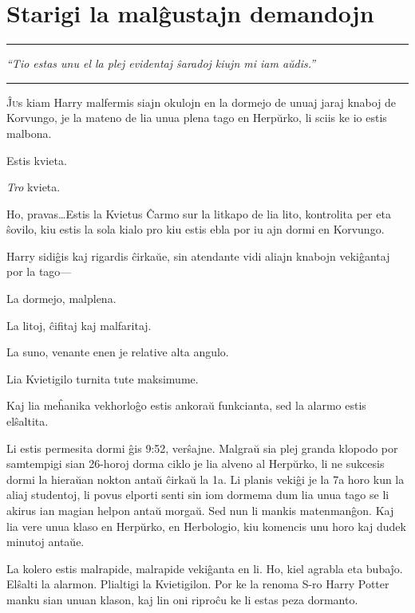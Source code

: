 \chapter{Starigi la malĝustajn demandojn}

\begin{center}\rule{3in}{0.4pt}\end{center}

\emph{``Tio estas unu el la plej evidentaj ŝaradoj kiujn mi iam aŭdis.''}  

\begin{center}\rule{3in}{0.4pt}\end{center}

\lettrine{Ĵ}us kiam Harry malfermis siajn okulojn en la dormejo
de unuaj jaraj knaboj de Korvungo, je la mateno de lia unua plena
tago en Herpŭrko, li sciis ke io estis malbona.

Estis kvieta.

\emph{Tro} kvieta.

Ho, pravas\ldots Estis la Kvietus Ĉarmo sur la litkapo de lia lito,
kontrolita per eta ŝovilo, kiu estis la sola kialo pro kiu estis ebla
por iu ajn dormi en Korvungo.

Harry sidiĝis kaj rigardis ĉirkaŭe, sin atendante vidi aliajn knabojn vekiĝantaj
por la tago—

La dormejo, malplena.

La litoj, ĉifitaj kaj malfaritaj.

La suno, venante enen je relative alta angulo.

Lia Kvietigilo turnita tute maksimume.

Kaj lia meĥanika vekhorloĝo estis ankoraŭ funkcianta, sed la alarmo
estis elŝaltita.

Li estis permesita dormi ĝis 9:52, verŝajne. Malgraŭ sia plej granda
klopodo por samtempigi sian 26-horoj dorma ciklo je lia alveno al
Herpŭrko, li ne sukcesis dormi la hieraŭan nokton antaŭ ĉirkaŭ la 1a.
Li planis vekiĝi je la 7a horo kun la aliaj studentoj, li povus
elporti senti sin iom dormema dum lia unua tago se li akirus ian
magian helpon antaŭ morgaŭ. Sed nun li mankis matenmanĝon. Kaj lia
vere unua klaso en Herpŭrko, en Herbologio, kiu komencis unu horo kaj
dudek minutoj antaŭe.

La kolero estis malrapide, malrapide vekiĝanta en li. Ho, kiel agrabla
eta bubaĵo. Elŝalti la alarmon. Plialtigi la Kvietigilon. Por ke la
renoma S-ro Harry Potter manku sian unuan klason, kaj lin oni riproĉu
ke li estas peza dormanto.

